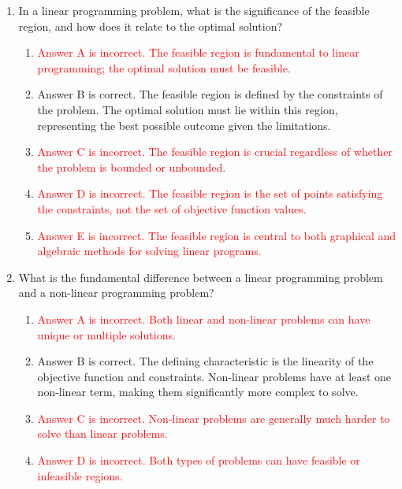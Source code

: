 \documentclass{article}%
\newcommand{\incorrect}[1]{\textcolor{red}{#1}}
\begin{document}
\begin{enumerate}
\begin{enumerate}
\item \incorrect{Answer D is incorrect. This constraint incorrectly uses the carpentry hours for tables but not chairs.}%
\item \incorrect{Answer E is incorrect. This constraint incorrectly uses the finishing hours for chairs and carpentry hours for tables.}%
\end{enumerate}%
\vspace{1em}%
\item In a linear programming problem, what is the significance of the feasible region, and how does it relate to the optimal solution?%
\begin{enumerate}%
\item \incorrect{Answer A is incorrect. The feasible region is fundamental to linear programming; the optimal solution must be feasible.}%
\item Answer B is correct. The feasible region is defined by the constraints of the problem. The optimal solution must lie within this region, representing the best possible outcome given the limitations.%
\item \incorrect{Answer C is incorrect. The feasible region is crucial regardless of whether the problem is bounded or unbounded.}%
\item \incorrect{Answer D is incorrect. The feasible region is the set of points satisfying the constraints, not the set of objective function values.}%
\item \incorrect{Answer E is incorrect. The feasible region is central to both graphical and algebraic methods for solving linear programs.}%
\end{enumerate}%
\vspace{1em}%
\item What is the fundamental difference between a linear programming problem and a non-linear programming problem?%
\begin{enumerate}%
\item \incorrect{Answer A is incorrect. Both linear and non-linear problems can have unique or multiple solutions.}%
\item Answer B is correct. The defining characteristic is the linearity of the objective function and constraints. Non-linear problems have at least one non-linear term, making them significantly more complex to solve.%
\item \incorrect{Answer C is incorrect.  Non-linear problems are generally much harder to solve than linear problems.}%
\item \incorrect{Answer D is incorrect. Both types of problems can have feasible or infeasible regions.}%

\end{enumerate}
\end{enumerate}
\end{document}
